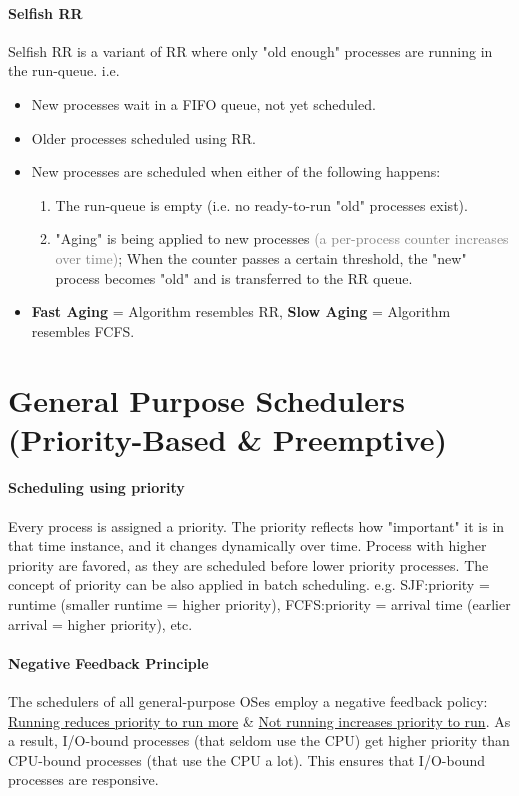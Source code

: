 \documentclass[openany,12pt]{book}
\newcommand{\gray}[1]{\textcolor{gray}{#1}}
\begin{document}
\paragraph{Selfish RR} Selfish RR is a variant of RR where only "old enough" processes are running in the run-queue. i.e.
\begin{itemize}
  \item New processes wait in a FIFO queue, not yet scheduled.
  \item Older processes scheduled using RR.
  \item New processes are scheduled when either of the following happens:
        \begin{enumerate}
          \item The run-queue is empty (i.e. no ready-to-run "old" processes exist).
          \item "Aging" is being applied to new processes \gray{(a per-process counter increases over time)}; When the counter passes a certain threshold, the "new" process becomes "old" and is transferred to the RR queue.
        \end{enumerate}
  \item \textbf{Fast Aging} = Algorithm resembles RR, \textbf{Slow Aging} = Algorithm resembles FCFS.
\end{itemize}


\section*{General Purpose Schedulers (Priority-Based \& Preemptive)}

\paragraph{Scheduling using priority} Every process is assigned a priority. The priority reflects how "important" it is in that time instance, and it changes dynamically over time. Process with higher priority are favored, as they are scheduled before lower priority processes. The concept of priority can be also applied in batch scheduling. e.g. SJF:priority = runtime (smaller runtime = higher priority), FCFS:priority = arrival time (earlier arrival = higher priority), etc.

\paragraph{Negative Feedback Principle} The schedulers of all general-purpose OSes employ a negative feedback policy: \ul{Running reduces priority to run more} \& \ul{Not running increases priority to run}.
As a result, I/O-bound processes (that seldom use the CPU) get higher priority than CPU-bound processes (that use the CPU a lot). This ensures that I/O-bound processes are responsive.
\end{document}
